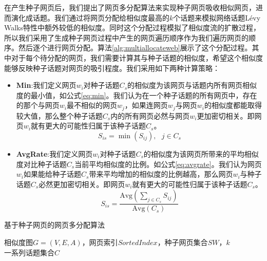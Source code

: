 在产生种子网页后，我们提出了网页多分配算法来实现种子网页吸收相似网页，进而演化成话题。我们通过将网页分配给相似度最高的$k$个话题来模拟网络话题L\'evy Walks特性中额外较低的相似度。同时这个分配过程模拟了相似度流的扩散过程，所以我们采用了生成种子网页过程中产生的网页遍历顺序作为我们遍历网页的顺序。然后逐个进行网页分配。算法\ref{alg:multiallocateweb}展示了这个分配过程。其中对于每个待分配的网页，我们需要计算其与种子话题的相似度，希望这个相似度能够反映种子话题对网页的吸引程度。我们采用如下两种计算策略：
\begin{itemize}
  \item \textbf{Min}:我们定义网页$w_i$对种子话题$C_s$的相似度为该网页与话题内所有网页相似度的最小值，如公式\ref{eq:min}。我们认为在一个种子话题的所有网页中，存在的那个与网页$w_i$最不相似的网页$w_j$，如果连网页$w_j$与网页$w_i$的相似度都能取得较大值，那么整个种子话题$C_s$内的所有网页必然与网页$w_i$更加密切相关。即网页$w_i$就有更大的可能性归属于该种子话题$C_s$。
  \begin{equation}\label{eq:min}
    S_{is} = \min(S_{ij}),\ \ \ j \in C_s
  \end{equation}
  \item \textbf{AvgRate}:我们定义网页$w_i$对种子话题$C_s$的相似度为该网页所带来的平均相似度对比种子话题$C_s$当前平均相似度的比例。如公式\ref{eq:avgrate}。我们认为网页$w_i$如果能给种子话题$C_s$带来平均增加的相似度的比例越高，那么网页$w_i$与种子话题$C_s$必然更加密切相关。即网页$w_i$就有更大的可能性归属于该种子话题$C_s$。
  \begin{equation}\label{eq:avgrate}
    S_{is} = \frac{\text{Avg}(\sum_{j\in C_s}S_{ij})}{\text{Avg}(C_s)}
  \end{equation}
\end{itemize}

\begin{algorithm}[!htbp]
    \caption{基于种子网页的网页多分配算法}\label{alg:multiallocateweb}
    \hspace*{0.02in}{\bf Input:}
    相似度图$G=(V,E,A)$，网页索引$SortedIndex$，种子网页集合$SW$，$k$\\
    \hspace*{0.02in}{\bf Output:}
    一系列话题集合$C$
\end{algorithm}

